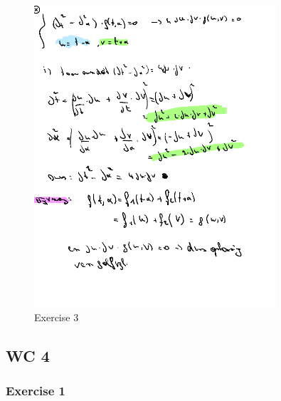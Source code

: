 \documentclass[a4paper]{report}
\begin{document}
\begin{figure}[H]
	\centering
	\includegraphics[width=0.8\textwidth]{assets/bord_4_ex_3.png}
	\caption{Exercise 3}
	\label{fig:bord_4_ex_3}
\end{figure}

\subsection{WC 4}

\subsubsection{Exercise 1}
\end{document}
